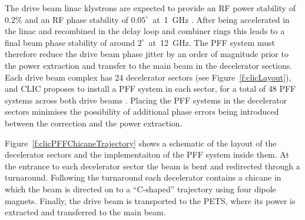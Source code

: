 The drive beam linac klystrons are expected to provide an RF power stability of 0.2\% and an RF phase stability of \(0.05^\circ\)~at~1~GHz \cite{clicCDR}. After being accelerated in the linac and recombined in the delay loop and combiner rings this leads to a final beam phase stability of around \(2^\circ\)~at~12~GHz. The PFF system must therefore reduce the drive beam phase jitter by an order of magnitude prior to the power extraction and transfer to the main beam in the decelerator sections. Each drive beam complex has 24 decelerator sectors (see Figure~\ref{f:clicLayout}), and CLIC proposes to install a PFF system in each sector, for a total of 48 PFF systems across both drive beams \cite{clicCDR}. Placing the PFF systems in the decelerator sectors minimises the possibility of additional phase errors being introduced between the correction and the power extraction.


Figure~\ref{f:clicPFFChicaneTrajectory} shows a schematic of the layout of the decelerator sectors and the implementaiton of the PFF system inside them. At the entrance to each decelerator sector the beam is bent and redirected through a turnaround. Following the turnaround each decelerator contains a chicane in which the beam is directed on to a ``C-shaped'' trajectory using four dipole magnets. Finally, the drive beam is transported to the PETS, where its power is extracted and transferred to the main beam.


